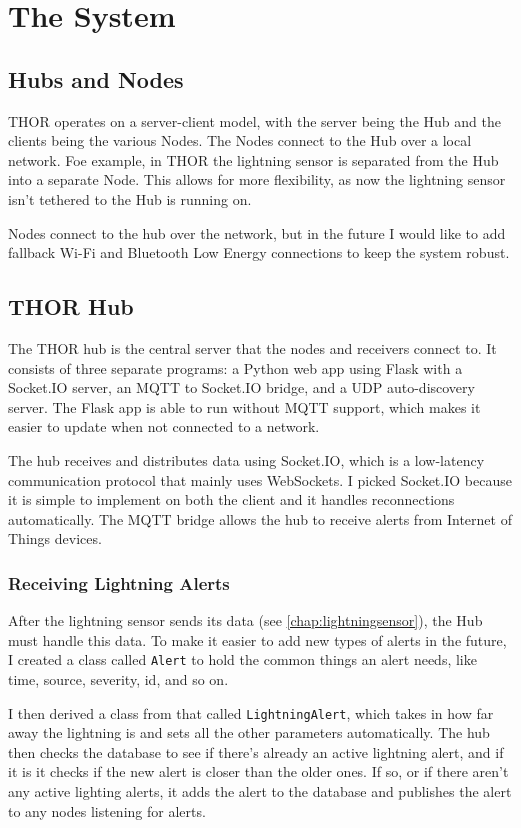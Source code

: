 \chapter{The System}

\section{Hubs and Nodes}
THOR operates on a server-client model, with the server being the Hub and the clients being the various Nodes. The Nodes connect to the Hub over a local network. Foe example, in THOR the lightning sensor is separated from the Hub into a separate Node. This allows for more flexibility, as now the lightning sensor isn't tethered to the Hub is running on. 

Nodes connect to the hub over the network, but in the future I would like to add fallback Wi-Fi and Bluetooth Low Energy connections to keep the system robust.

\section{THOR Hub}
The THOR hub is the central server that the nodes and receivers connect to. It consists of three separate programs: a Python web app using Flask with a Socket.IO server, an MQTT to Socket.IO bridge, and a UDP auto-discovery server. The Flask app is able to run without MQTT support, which makes it easier to update when not connected to a network. 

The hub receives and distributes data using Socket.IO, which is a low-latency communication protocol that mainly uses WebSockets. I picked Socket.IO because it is simple to implement on both the client and it handles reconnections automatically. The MQTT bridge allows the hub to receive alerts from Internet of Things devices.

\subsection{Receiving Lightning Alerts}
\label{chap:lightningalerts}

After the lightning sensor sends its data (see \ref{chap:lightningsensor}), the Hub must handle this data. To make it easier to add new types of alerts in the future, I created a class called \texttt{Alert} to hold the common things an alert needs, like time, source, severity, id, and so on.

I then derived a class from that called \texttt{LightningAlert}, which takes in how far away the lightning is and sets all the other parameters automatically. The hub then checks the database to see if there's already an active lightning alert, and if it is it checks if the new alert is closer than the older ones. If so, or if there aren't any active lighting alerts, it adds the alert to the database and publishes the alert to any nodes listening for alerts.

